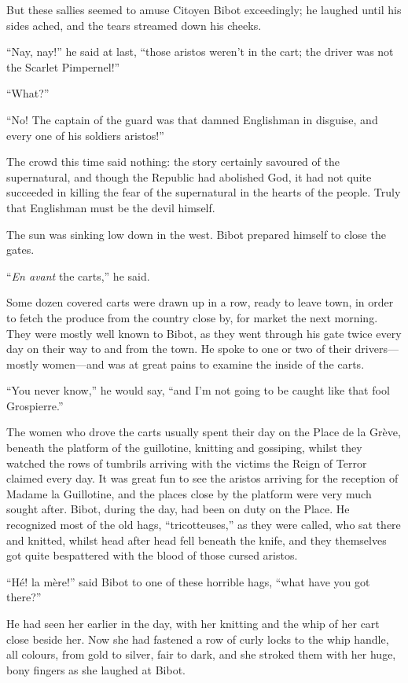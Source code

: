 \documentclass[paper=a5,BCOR=7mm,twoside,DIV=calc,12pt,usegeometry,chapterprefix,endperiod,headings=big]{scrbook}
\begin{document}
But these sallies seemed to amuse Citoyen Bibot exceedingly; he laughed until his sides ached, and the tears streamed down his cheeks.

\enquote{Nay, nay!} he said at last, \enquote{those aristos weren't in the cart; the driver was not the Scarlet Pimpernel!}

\enquote{What?}

\enquote{No! The captain of the guard was that damned Englishman in disguise, and every one of his soldiers aristos!}

The crowd this time said nothing: the story certainly \newline savoured of the supernatural, and though the Republic had abolished God, it had not quite succeeded in killing the fear of the supernatural in the hearts of the people. Truly that Englishman must be the devil himself.

The sun was sinking low down in the west. Bibot prepared himself to close the gates.

\enquote{\textit{En avant} the carts,} he said.

Some dozen covered carts were drawn up in a row, ready to leave town, in order to fetch the produce from the country close by, for market the next morning. They were mostly well known to Bibot, as they went through his gate twice every day on their way to and from the town. He spoke to one or two of their drivers---mostly women---and was at great pains to examine the inside of the carts.

\enquote{You never know,} he would say, \enquote{and I'm not going to be caught like that fool Grospierre.}

The women who drove the carts usually spent their day on the Place de la Grève, beneath the platform of the guillotine, knitting and gossiping, whilst they watched the rows of tumbrils arriving with the victims the Reign of Terror claimed every day. It was great fun to see the aristos arriving for the reception of Madame la Guillotine, and the places close by the platform were very much sought after. Bibot, during the day, had been on duty on the Place. He recognized most of the old hags, \enquote{tricotteuses,} as they were called, who sat there and knitted, whilst head after head fell beneath the knife, and they themselves got quite bespattered with the blood of those cursed aristos.

\enquote{Hé! la mère!} said Bibot to one of these horrible hags, \enquote{what have you got there?}

He had seen her earlier in the day, with her knitting and the whip of her cart close beside her. Now she had fastened a row of curly locks to the whip handle, all colours, from gold to silver, fair to dark, and she stroked them with her huge, bony fingers as she laughed at Bibot.
\end{document}
